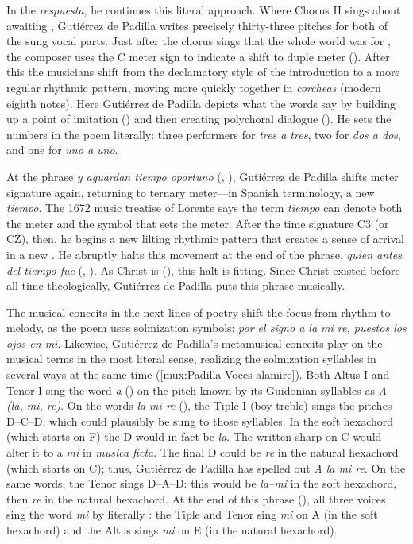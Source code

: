 In the \emph{respuesta}, he continues this literal approach.
Where Chorus II sings about awaiting , Gutiérrez de
Padilla writes precisely thirty-three pitches for both of the sung vocal parts.
Just after the chorus sings that the whole world was  for
, the composer uses the C meter sign to indicate a shift to
duple meter ().
After this the musicians shift from the declamatory style of the introduction to
a more regular rhythmic pattern, moving more quickly together in \emph{corcheas}
(modern eighth notes).
Here Gutiérrez de Padilla depicts what the words say by building up a point of
imitation  () and then
creating polychoral dialogue ().
He sets the numbers in the poem literally: three performers for \emph{tres a
tres}, two for \emph{dos a dos}, and one for \emph{uno a uno}.

At the phrase \emph{y aguardan tiempo oportuno} (, ), Gutiérrez de Padilla shifts meter signature
again, returning to ternary meter---in Spanish terminology, a new \emph{tiempo}.
The 1672 music treatise of Lorente says the term \emph{tiempo} can denote both
the meter and the symbol that sets the meter.%
    \Autocite[, 149]{Lorente:Porque}
After the time signature C3 (or CZ), then, he begins a new lilting rhythmic
pattern that creates a sense of arrival in a new .
He abruptly halts this movement at the end of the phrase, \emph{quien antes del
tiempo fue} (, ).
As Christ is  (), this halt is
fitting.  
Since Christ existed before all time theologically, Gutiérrez de Padilla puts
this phrase  musically.

The musical conceits in the next lines of poetry shift the focus from rhythm to
melody, as the poem uses solmization symbols: \emph{por el signo a la mi re,
puestos los ojos en mi}.
Likewise, Gutiérrez de Padilla's metamusical conceits play on the musical terms
in the most literal sense, realizing the solmization syllables in several ways
at the same time (\cref{mux:Padilla-Voces-alamire}).
Both Altus I and Tenor I sing the word \emph{a} () on the pitch
known by its Guidonian syllables as \emph{A (la, mi, re)}.
On the words \emph{la mi re} (), the Tiple I (boy treble) sings
the pitches D--C\sh{}--D, which could plausibly be sung to those syllables.
In the soft hexachord (which starts on F) the D would in fact be \emph{la}.
The written sharp on C would alter it to a \emph{mi} in \emph{musica ficta}. 
The final D could be \emph{re} in the natural hexachord (which starts on C);
thus, Gutiérrez de Padilla has spelled out \emph{A la mi re}.
On the same words, the Tenor sings D--A--D: this would be \emph{la--mi} in the
soft hexachord, then \emph{re} in the natural hexachord.
At the end of this phrase (), all three voices sing the word
\emph{mi} by literally : the Tiple and
Tenor sing \emph{mi} on A (in the soft hexachord) and the Altus sings \emph{mi}
on E (in the natural hexachord).

